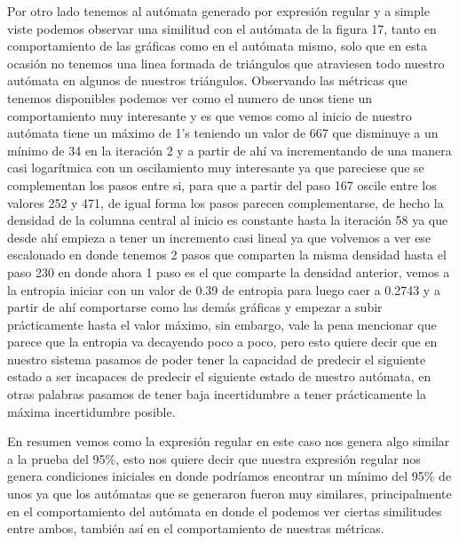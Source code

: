 \documentclass[11pt]{article}
\begin{document}
		 Por otro lado tenemos al autómata generado por expresión regular y a simple viste podemos observar una similitud con el autómata de la figura 17, tanto en comportamiento de las gráficas como en el autómata mismo, solo que en esta ocasión no tenemos una linea formada de triángulos que atraviesen todo nuestro autómata en algunos de nuestros triángulos. Observando las métricas que tenemos disponibles podemos ver como el numero de unos tiene un comportamiento muy interesante y es que vemos como al inicio de nuestro autómata tiene un máximo de 1's teniendo un valor de 667 que disminuye a un mínimo de 34 en la iteración 2 y a partir de ahí va incrementando de una manera casi logarítmica con un oscilamiento muy interesante ya que pareciese que se complementan los pasos entre si, para que a partir del paso 167 oscile entre los valores 252 y 471, de igual forma los pasos parecen complementarse, de hecho la densidad de la columna central al inicio es constante hasta la iteración 58 ya que desde ahí empieza a tener un incremento casi lineal ya que volvemos a ver ese escalonado en donde tenemos 2 pasos que comparten la misma densidad hasta el paso 230 en donde ahora 1 paso es el que comparte la densidad anterior, vemos a la entropia iniciar con un valor de 0.39 de entropia para luego caer a 0.2743 y a partir de ahí comportarse como las demás gráficas y empezar a subir prácticamente hasta el valor máximo, sin embargo, vale la pena mencionar que parece que la entropia va decayendo poco a poco, pero esto quiere decir que en nuestro sistema pasamos de poder tener la capacidad de predecir el siguiente estado a ser incapaces de predecir el siguiente estado de nuestro autómata, en otras palabras pasamos de tener baja incertidumbre a tener prácticamente la máxima incertidumbre posible.\par
		 En resumen vemos como la expresión regular en este caso nos genera algo similar a la prueba del 95\%, esto nos quiere decir que nuestra expresión regular nos genera condiciones iniciales en donde podríamos encontrar un mínimo del 95\% de unos ya que los autómatas que se generaron fueron muy similares, principalmente en el comportamiento del autómata en donde el podemos ver ciertas similitudes entre ambos, también así en el comportamiento de nuestras métricas.
\end{document}
